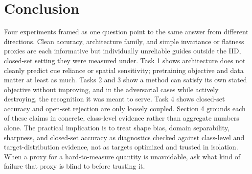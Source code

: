 \documentclass{article}
\begin{document}
\section{Conclusion}

Four experiments framed as one question point to the same answer from different directions. Clean
accuracy, architecture family, and simple invariance or flatness proxies are each informative but
individually unreliable guides outside the IID, closed-set setting they were measured under. Task 1
shows architecture does not cleanly predict cue reliance or spatial sensitivity; pretraining
objective and data matter at least as much. Tasks 2 and 3 show a method can satisfy its own stated
objective without improving, and in the adversarial cases while actively destroying, the
recognition it was meant to serve. Task 4 shows closed-set accuracy and open-set rejection are only
loosely coupled. Section 4 grounds each of these claims in concrete, class-level evidence rather
than aggregate numbers alone. The practical implication is to treat shape bias, domain
separability, sharpness, and closed-set accuracy as diagnostics checked against class-level and
target-distribution evidence, not as targets optimized and trusted in isolation. When a proxy for a
hard-to-measure quantity is unavoidable, ask what kind of failure that proxy is blind to before
trusting it.



\end{document}
